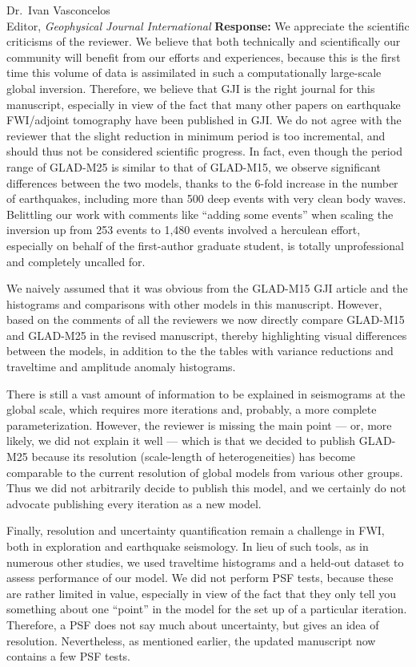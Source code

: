 \documentclass[11pt,a4paper]{letter}
\newcommand{\response}[1]{\textbf{Response:} #1}
\begin{document}
\begin{letter}{Dr.~Ivan Vasconcelos\\
Editor, \textit{Geophysical Journal International}}
\response{We appreciate the scientific criticisms of the reviewer.
We believe that both technically and scientifically our community will benefit from our efforts and experiences, because this is the first time this volume of data is
assimilated in such a computationally large-scale global inversion.
Therefore,
we believe that GJI is the right journal for this manuscript,
especially in view of the fact that many other papers on earthquake FWI/adjoint tomography have been published in GJI.
We do not agree with the reviewer that the slight reduction in minimum period is too incremental, and should thus not be considered scientific progress.
In fact, even though the period range of GLAD-M25 is similar to that of GLAD-M15,
we observe significant differences between the two models,
thanks to the 6-fold increase in the number of earthquakes,
including more than 500 deep events with very clean body waves.
Belittling our work with comments like ``adding some events'' when scaling the inversion up from 253 events to 1,480 events involved a herculean effort, especially on behalf of the first-author graduate student, is totally unprofessional and completely uncalled for.

We naively assumed that it was obvious from the GLAD-M15 GJI article and the histograms and comparisons with other models in this manuscript.
However, based on the comments of all the reviewers we now directly compare GLAD-M15 and GLAD-M25 in the revised manuscript,
thereby highlighting visual differences between the models, in addition to the the tables with variance reductions and traveltime and amplitude anomaly histograms.

There is still a vast amount of information to be explained in seismograms at the global scale, which requires more iterations and, probably, a more complete parameterization.
However, the reviewer is missing the main point --- or, more likely, we did not explain it well --- which is that we decided to publish GLAD-M25 because its resolution (scale-length of heterogeneities) has become comparable to the current resolution of global models from various other groups.
Thus we did not arbitrarily decide to publish this model,
and we certainly do not advocate publishing every iteration as a new model.

Finally, resolution and uncertainty quantification remain a challenge in FWI,
both in exploration and earthquake seismology.
In lieu of such tools,
as in numerous other studies,
we used traveltime histograms and a held-out dataset to assess performance of our model.
We did not perform PSF tests, because these are rather limited in value, especially in view of the fact that they only tell you something about one ``point'' in the model for the set up of a particular iteration.
Therefore, a PSF does not say much about uncertainty, but gives an idea of resolution.
Nevertheless,
as mentioned earlier,
the updated manuscript now contains a few PSF tests.}



\end{letter}
\end{document}
